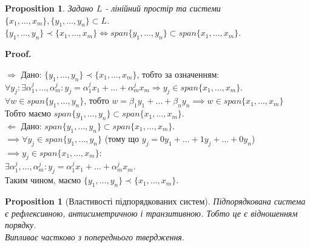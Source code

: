 \documentclass[a4paper, 10pt]{article}
\makeatletter
\def\qed{$\blacksquare$}
\def\rightproof{$\boxed{\Rightarrow}$ }
\def\leftproof{$\boxed{\Leftarrow}$ }
\theoremstyle{theoremdd}
\theoremstyle{theoremdd}
\theoremstyle{theoremdd}
\theoremstyle{theoremdd}
\theoremstyle{theoremdd}
\newtheorem{proposition}[theorem]{Proposition}
\theoremstyle{theoremdd}
\theoremstyle{theoremdd}
\theoremstyle{theoremdd}
\renewenvironment{proof}[1][Proof.\\]{\par
\pushQED{\hfill \qed}%
\normalfont \topsep6\p@\@plus6\p@\relax
\trivlist
\item\relax
{\bfseries
#1\@addpunct{.}}\hspace\labelsep\ignorespaces
}{%
\popQED\endtrivlist\@endpefalse
}
\makeatother
\begin{document}
	\begin{proposition}
	Задано $L$ - лінійний простір та системи $\{x_1,\dots,x_m\}, \{y_1,\dots,y_n\} \subset L$.\\
	$\{y_1, \dots, y_n \} \prec \{x_1, \dots, x_m \} \iff span \{y_1, \dots, y_n\} \subset span \{x_1, \dots, x_m \}$.
	\end{proposition}
	
	\begin{proof}
	\rightproof Дано: $\{y_1, \dots, y_n \} \prec \{x_1, \dots, x_m \}$, тобто за означенням:\\
	$\forall y_j: \exists \alpha^j_1, \dots, \alpha^j_m: y_j = \alpha^j_1 x_1 + \dots + \alpha^j_m x_m \Rightarrow y_j \in span\{x_1, \dots, x_m\}$.\\
	$\forall w \in span\{y_1, \dots, y_n\}$, тобто $w = \beta_1 y_1 + \dots + \beta_n y_n \implies w \in span\{x_1, \dots, x_m\}$\\
	Тобто маємо $span \{y_1, \dots, y_n\} \subset span \{x_1, \dots, x_m \}$.
	\bigskip \\
	\leftproof Дано: $span \{y_1, \dots, y_n\} \subset span \{x_1, \dots, x_m \}$.\\
	$\implies \forall y_j \in span \{y_1, \dots, y_n \}$ \hspace{0.2cm}(тому що $y_j = 0y_1 + \dots + 1 y_j + \dots + 0 y_n$)\hspace{0.2cm} $\implies y_j \in span\{x_1,\dots,x_m\}$:\\
	$\exists \alpha^j_1, \dots, \alpha^j_m: y_j = \alpha^j_1 x_1 + \dots + \alpha^j_m x_m$.\\
	Таким чином, маємо $\{y_1, \dots, y_n \} \prec \{x_1, \dots, x_m \}$.
	\end{proof}
	
	\begin{proposition}[Властивості підпорядкованих систем]
	Підпорядкована система є рефлексивною, антисиметричною і транзитивною. Тобто це є відношенням порядку.\\
	\textit{Випливає частково з попереднього твердження.}
	\end{proposition}
	
\end{document}
